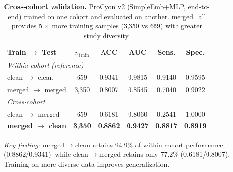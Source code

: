 \begin{table}[t]
\centering
\caption{\textbf{Cross-cohort validation.}
ProCyon v2 (SimpleEmb+MLP, end-to-end) trained on one cohort and evaluated on another.
merged\_all provides $5\times$ more training samples (3,350 vs 659) with greater study diversity.}
\label{tab:cross_cohort}
\begin{tabular}{lccccc}
\toprule
\textbf{Train $\rightarrow$ Test} & \textbf{$n_\text{train}$} & \textbf{ACC} & \textbf{AUC} & \textbf{Sens.} & \textbf{Spec.} \\
\midrule
\multicolumn{6}{l}{\textit{Within-cohort (reference)}} \\
\;\; clean $\rightarrow$ clean & 659 & 0.9341 & 0.9815 & 0.9140 & 0.9595 \\
\;\; merged $\rightarrow$ merged & 3,350 & 0.8007 & 0.8545 & 0.7040 & 0.9022 \\
\midrule
\multicolumn{6}{l}{\textit{Cross-cohort}} \\
\;\; clean $\rightarrow$ merged & 659 & 0.6181 & 0.8060 & 0.2541 & 1.0000 \\
\;\; \textbf{merged $\rightarrow$ clean} & \textbf{3,350} & \textbf{0.8862} & \textbf{0.9427} & \textbf{0.8817} & \textbf{0.8919} \\
\bottomrule
\end{tabular}

\vspace{4pt}
\textit{Key finding:} merged$\rightarrow$clean retains 94.9\% of within-cohort performance (0.8862/0.9341),
while clean$\rightarrow$merged retains only 77.2\% (0.6181/0.8007).
Training on more diverse data improves generalization.
\end{table}
